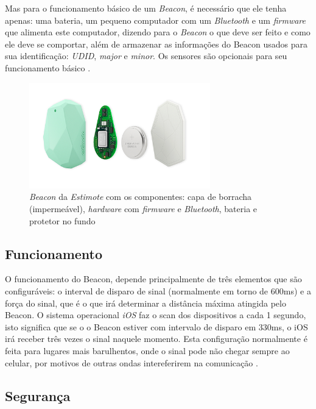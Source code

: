 \documentclass[
	12pt,
	oneside,
	a4paper,
	english,
	brazil,
]{abntex2}
\begin{document}
Mas para o funcionamento básico de um \emph{Beacon}, é necessário que ele tenha apenas: uma bateria, um pequeno computador com um \emph{Bluetooth} e um \emph{firmware} que alimenta este computador, dizendo para o \emph{Beacon} o que deve ser feito e como ele deve se comportar, além de armazenar as informações do Beacon usados para sua identificação: \emph{UDID}, \emph{major} e \emph{minor}. Os sensores são opcionais para seu funcionamento básico \cite{beacon-basic-hardware}.

\begin{figure}[h]
\centering
\includegraphics[width=0.7\textwidth]{estimote-beacon}
\caption{\emph{Beacon} da \emph{Estimote} com os componentes: capa de borracha (impermeável), \emph{hardware} com \emph{firmware} e \emph{Bluetooth}, bateria e protetor no fundo}
\end{figure}

\subsection{Funcionamento}

O funcionamento do Beacon, depende principalmente de três elementos que são configuráveis: o interval de disparo de sinal (normalmente em torno de 600ms) e a força do sinal, que é o que irá determinar a distância máxima atingida pelo Beacon. O sistema operacional \emph{iOS} faz o scan dos dispositivos a cada 1 segundo, isto significa que se o o Beacon estiver com intervalo de disparo em 330ms, o iOS irá receber três vezes o sinal naquele momento. Esta configuração normalmente é feita para lugares mais barulhentos, onde o sinal pode não chegar sempre ao celular, por motivos de outras ondas intereferirem na comunicação \cite{beacon-how-it-works-estimote}.

\subsection{Segurança}
\end{document}
